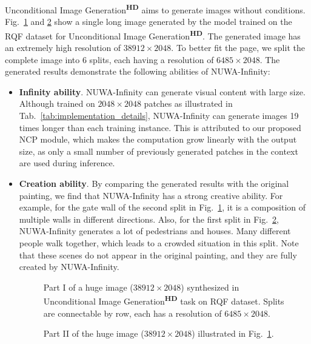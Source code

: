 \documentclass{article}
\begin{document}
Unconditional Image Generation\textsuperscript{\textbf{HD}} aims to generate images without conditions. Fig.~\ref{fig:uig1} and \ref{fig:uig2} show a single long image generated by the model trained on the RQF dataset for Unconditional Image Generation\textsuperscript{\textbf{HD}}. The generated image has an extremely high resolution of $38912\times 2048$. To better fit the page, we split the complete image into 6 splits, each having a resolution of $6485\times 2048$. The generated results demonstrate the following abilities of NUWA-Infinity: 
\begin{itemize}[leftmargin=*]

\item \textbf{Infinity ability}.  NUWA-Infinity can generate visual content with large size. Although trained on $2048 \times 2048$ patches as illustrated in Tab.~\ref{tab:implementation_details}, NUWA-Infinity can generate images 19 times longer than each training instance. This is attributed to our proposed NCP module, which makes the computation grow linearly with the output size, as only a small number of previously generated patches in the context are used during inference. 

\item \textbf{Creation ability}. By comparing the generated results with the original painting, we find that NUWA-Infinity has a strong creative ability. For example, for the gate wall of the second split in Fig.~\ref{fig:uig1}, it is a composition of multiple walls in different directions. Also, for the first split in Fig.~\ref{fig:uig2}, NUWA-Infinity generates a lot of pedestrians and houses. Many different people walk together, which leads to a crowded situation in this split. Note that these scenes do not appear in the original painting, and they are fully created by NUWA-Infinity.

\begin{figure}[h]
    \caption{Part I of a huge image ($38912\times 2048$) synthesized in Unconditional Image Generation\textsuperscript{\textbf{HD}} task on RQF dataset. Splits are connectable by row, each has a resolution of $6485\times 2048$.}
    \label{fig:uig1}
\end{figure}


\begin{figure}[p]
 \vspace*{-2.3cm}
\caption{Part II of the huge image ($38912\times 2048$) illustrated in Fig.~\ref{fig:uig1}.}
    \label{fig:uig2}
\end{figure}




\end{itemize}
\end{document}
